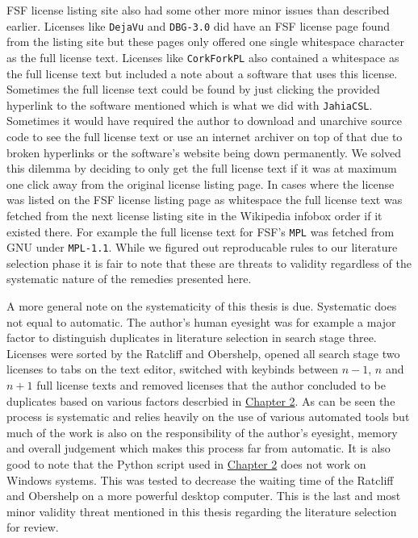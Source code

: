FSF license listing site also had some other more minor issues than described earlier. Licenses like \texttt{DejaVu} and \texttt{DBG-3.0} did have an FSF license page found from the listing site but these pages only offered one single whitespace character as the full license text. Licenses like \texttt{CorkForkPL} also contained a whitespace as the full license text but included a note about a software that uses this license. Sometimes the full license text could be found by just clicking the provided hyperlink to the software mentioned which is what we did with \texttt{JahiaCSL}. Sometimes it would have required the author to download and unarchive source code to see the full license text or use an internet archiver on top of that due to broken hyperlinks or the software's website being down permanently. We solved this dilemma by deciding to only get the full license text if it was at maximum one click away from the original license listing page. In cases where the license was listed on the FSF license listing page as whitespace the full license text was fetched from the next license listing site in the Wikipedia infobox order if it existed there. For example the full license text for FSF's \texttt{MPL} was fetched from GNU under \texttt{MPL-1.1}. While we figured out reproducable rules to our literature selection phase it is fair to note that these are threats to validity regardless of the systematic nature of the remedies presented here.

A more general note on the systematicity of this thesis is due. Systematic does not equal to automatic. The author's human eyesight was for example a major factor to distinguish duplicates in literature selection in search stage three. Licenses were sorted by the Ratcliff and Obershelp, opened all search stage two licenses to tabs on the text editor, switched with keybinds between $n - 1$, $n$ and $n + 1$ full license texts and removed licenses that the author concluded to be duplicates based on various factors descrbied in \hyperref[methods]{Chapter 2}. As can be seen the process is systematic and relies heavily on the use of various automated tools but much of the work is also on the responsibility of the author's eyesight, memory and overall judgement which makes this process far from automatic. It is also good to note that the Python script used in \hyperref[methods]{Chapter 2} does not work on Windows systems. This was tested to decrease the waiting time of the Ratcliff and Obershelp on a more powerful desktop computer. This is the last and most minor validity threat mentioned in this thesis regarding the literature selection for review.

